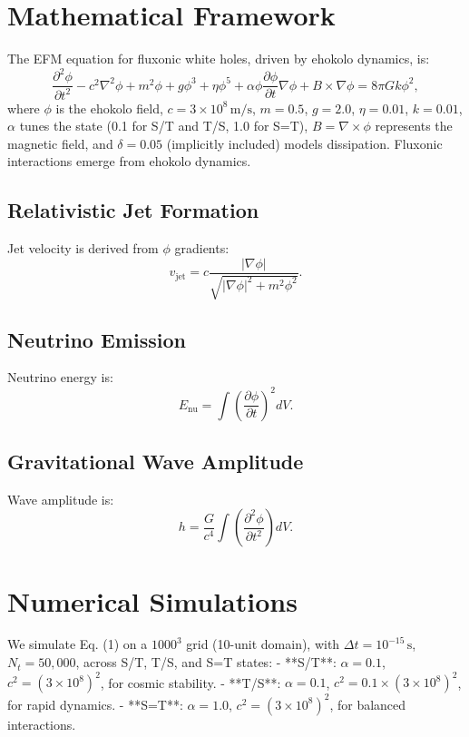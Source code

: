 \documentclass[11pt]{article}
\begin{document}
\section{Mathematical Framework}
The EFM equation for fluxonic white holes, driven by ehokolo dynamics, is:
\begin{equation}
\frac{\partial^2 \phi}{\partial t^2} - c^2 \nabla^2 \phi + m^2 \phi + g \phi^3 + \eta \phi^5 + \alpha \phi \frac{\partial \phi}{\partial t} \nabla \phi + B \times \nabla \phi = 8 \pi G k \phi^2,
\end{equation}
where \(\phi\) is the ehokolo field, \(c = 3 \times 10^8 \, \text{m/s}\), \(m = 0.5\), \(g = 2.0\), \(\eta = 0.01\), \(k = 0.01\), \(\alpha\) tunes the state (0.1 for S/T and T/S, 1.0 for S=T), \(B = \nabla \times \phi\) represents the magnetic field, and \(\delta = 0.05\) (implicitly included) models dissipation. Fluxonic interactions emerge from ehokolo dynamics.

\subsection{Relativistic Jet Formation}
Jet velocity is derived from \(\phi\) gradients:
\begin{equation}
v_{\text{jet}} = c \frac{|\nabla \phi|}{\sqrt{|\nabla \phi|^2 + m^2 \phi^2}}.
\end{equation}

\subsection{Neutrino Emission}
Neutrino energy is:
\begin{equation}
E_{\text{nu}} = \int \left( \frac{\partial \phi}{\partial t} \right)^2 dV.
\end{equation}

\subsection{Gravitational Wave Amplitude}
Wave amplitude is:
\begin{equation}
h = \frac{G}{c^4} \int \left( \frac{\partial^2 \phi}{\partial t^2} \right) dV.
\end{equation}

\section{Numerical Simulations}
We simulate Eq. (1) on a $1000^3$ grid (10-unit domain), with \(\Delta t = 10^{-15} \, \text{s}\), \(N_t = 50,000\), across S/T, T/S, and S=T states:
- **S/T**: \(\alpha = 0.1\), \(c^2 = (3 \times 10^8)^2\), for cosmic stability.
- **T/S**: \(\alpha = 0.1\), \(c^2 = 0.1 \times (3 \times 10^8)^2\), for rapid dynamics.
- **S=T**: \(\alpha = 1.0\), \(c^2 = (3 \times 10^8)^2\), for balanced interactions.
\end{document}
